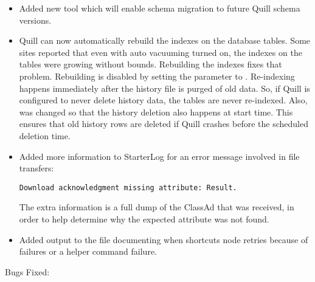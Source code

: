 \begin{itemize}

\item Added new tool  which will
enable schema migration to future Quill schema versions.

\item Quill can now automatically rebuild the indexes on the
 database tables.  Some sites reported that even
with auto vacuuming turned on, the indexes on the tables were 
growing without bounds.  Rebuilding the indexes fixes that problem.
Rebuilding is disabled by setting the parameter 
to .  Re-indexing happens immediately after the history file
is purged of old data. So, if Quill is configured to never delete
history data, the tables are never re-indexed.  Also, 
was changed so that the history deletion also happens at start time.
This ensures that old history rows are deleted if Quill crashes
before the scheduled deletion time.

\item Added more information to StarterLog for an error message
involved in file transfers: 
\begin{verbatim}
Download acknowledgment missing attribute: Result.
\end{verbatim}
The extra information is a full dump of the
ClassAd that was received, in order to help determine why the expected
attribute was not found.

\item Added output to the  file documenting when
 shortcuts node retries because of 
failures or a helper command failure.

\end{itemize}

\noindent Bugs Fixed:

